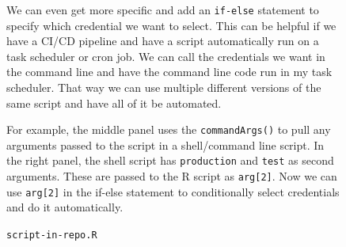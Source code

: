 \documentclass[
  letterpaper,
  DIV=11,
  numbers=noendperiod,
  oneside]{scrartcl}
\newenvironment{Shaded}{\begin{snugshade}}{\end{snugshade}}
\newcommand{\CommentTok}[1]{\textcolor[rgb]{0.37,0.37,0.37}{#1}}
\newcommand{\ConstantTok}[1]{\textcolor[rgb]{0.56,0.35,0.01}{#1}}
\newcommand{\ControlFlowTok}[1]{\textcolor[rgb]{0.00,0.23,0.31}{\textbf{#1}}}
\newcommand{\DecValTok}[1]{\textcolor[rgb]{0.68,0.00,0.00}{#1}}
\newcommand{\FunctionTok}[1]{\textcolor[rgb]{0.28,0.35,0.67}{#1}}
\newcommand{\NormalTok}[1]{\textcolor[rgb]{0.00,0.23,0.31}{#1}}
\newcommand{\OtherTok}[1]{\textcolor[rgb]{0.00,0.23,0.31}{#1}}
\newcommand{\SpecialCharTok}[1]{\textcolor[rgb]{0.37,0.37,0.37}{#1}}
\newcommand{\StringTok}[1]{\textcolor[rgb]{0.13,0.47,0.30}{#1}}
\begin{document}
\begin{figure}

We can even get more specific and add an \texttt{if-else} statement to
specify which credential we want to select. This can be helpful if we
have a CI/CD pipeline and have a script automatically run on a task
scheduler or cron job. We can call the credentials we want in the
command line and have the command line code run in my task scheduler.
That way we can use multiple different versions of the same script and
have all of it be automated.

For example, the middle panel uses the \texttt{commandArgs()} to pull
any arguments passed to the script in a shell/command line script. In
the right panel, the shell script has \texttt{production} and
\texttt{test} as second arguments. These are passed to the R script as
\texttt{arg{[}2{]}}. Now we can use \texttt{arg{[}2{]}} in the if-else
statement to conditionally select credentials and do it automatically.

\begin{codelisting}

\caption{\texttt{script-in-repo.R}}

\begin{Shaded}
\end{Shaded}


\end{codelisting}
\end{figure}
\end{document}
